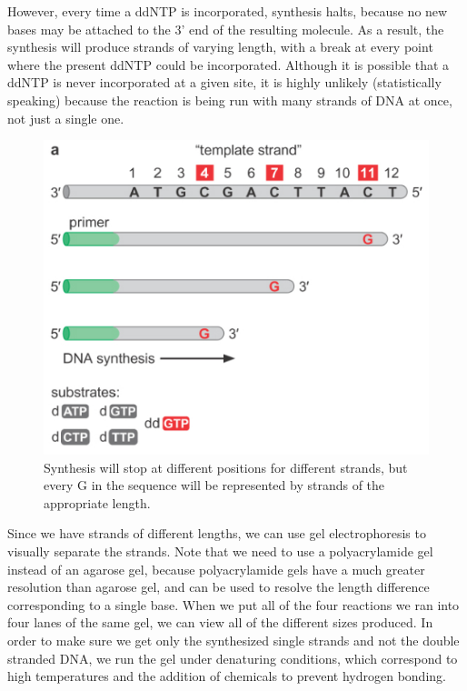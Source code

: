 \documentclass{article}
\begin{document}
However, every time a ddNTP is incorporated, synthesis halts, because no new bases may be attached
to the 3' end of the resulting molecule. As a result, the synthesis will produce strands of varying
length, with a break at every point where the present ddNTP could be incorporated. Although it is
possible that a ddNTP is never incorporated at a given site, it is highly unlikely (statistically
speaking) because the reaction is being run with many strands of DNA at once, not just a single one.

\begin{figure}[h!]
    \centering
    \includegraphics[scale=0.5]{images/stopped-synthesis.png}
    \caption{
        Synthesis will stop at different positions for different strands, but every G in the
        sequence will be represented by strands of the appropriate length.
   }
\end{figure}

Since we have strands of different lengths, we can use gel electrophoresis to visually separate the
strands. Note that we need to use a polyacrylamide gel instead of an agarose gel, because
polyacrylamide gels have a much greater resolution than agarose gel, and can be used to resolve the
length difference corresponding to a single base. When we put all of the four reactions we ran into
four lanes of the same gel, we can view all of the different sizes produced. In order to make sure
we get only the synthesized single strands and not the double stranded DNA, we run the gel under
denaturing conditions, which correspond to high temperatures and the addition of chemicals to
prevent hydrogen bonding.
\end{document}
